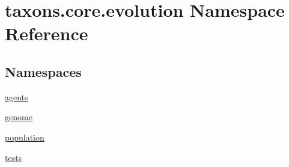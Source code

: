 \hypertarget{namespacetaxons_1_1core_1_1evolution}{}\section{taxons.\+core.\+evolution Namespace Reference}
\label{namespacetaxons_1_1core_1_1evolution}
\subsection*{Namespaces}
\begin{DoxyCompactItemize}
\item 
 \hyperlink{namespacetaxons_1_1core_1_1evolution_1_1agents}{agents}
\item 
 \hyperlink{namespacetaxons_1_1core_1_1evolution_1_1genome}{genome}
\item 
 \hyperlink{namespacetaxons_1_1core_1_1evolution_1_1population}{population}
\item 
 \hyperlink{namespacetaxons_1_1core_1_1evolution_1_1tests}{tests}
\end{DoxyCompactItemize}
